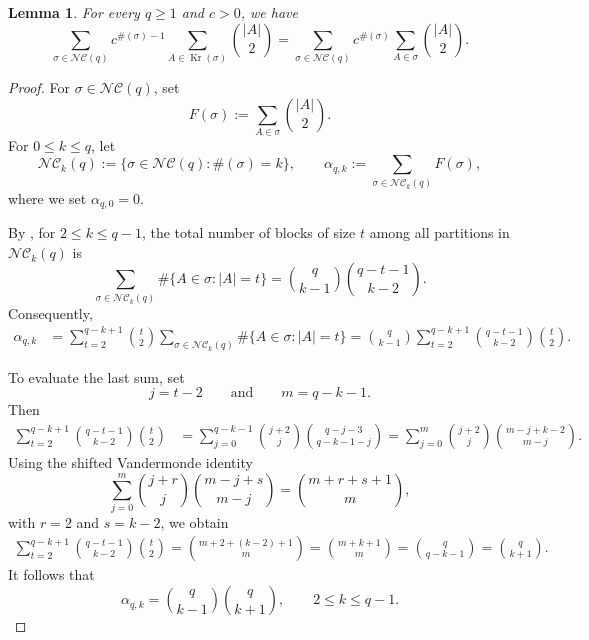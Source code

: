 \documentclass{article}
\newtheorem{lemma}      [theorem]{Lemma}
\theoremstyle{definition}
\newcommand{\NC}{\mathcal{NC}}
\begin{document}
{%

\begin{lemma}\label{lem:weighted-Kreweras-identity}
For every \(q\geq 1\) and \(c>0\), we have
\[
\sum_{\sigma\in\NC(q)}
c^{\#(\sigma)-1}
\sum_{A\in\operatorname{Kr}(\sigma)}
\binom{|A|}{2}
=
\sum_{\sigma\in\NC(q)}
c^{\#(\sigma)}
\sum_{A\in\sigma}
\binom{|A|}{2}.
\]
\end{lemma}

\begin{proof}
For \(\sigma\in\NC(q)\), set
\[
F(\sigma)
:=
\sum_{A\in\sigma}\binom{|A|}{2}.
\]
For \(0\leq k\leq q\), let
\[
\NC_k(q)
:=
\bigl\{
\sigma\in\NC(q):\#(\sigma)=k
\bigr\},
\qquad
\alpha_{q,k}
:=
\sum_{\sigma\in\NC_k(q)}F(\sigma),
\]
where we set \(\alpha_{q,0}=0\).

By \cite[Proposition~2.1]{Arizmendi12}, for
\(2\leq k\leq q-1\), the total number of blocks of size \(t\)
among all partitions in \(\NC_k(q)\) is
\[
\sum_{\sigma\in\NC_k(q)}
\#\bigl\{
A\in\sigma:|A|=t
\bigr\}
=
\binom{q}{k-1}
\binom{q-t-1}{k-2}.
\]
Consequently,
\begin{align*}
\alpha_{q,k}
&=
\sum_{t=2}^{q-k+1}
\binom{t}{2}
\sum_{\sigma\in\NC_k(q)}
\#\bigl\{
A\in\sigma:|A|=t
\bigr\} 
=
\binom{q}{k-1}
\sum_{t=2}^{q-k+1}
\binom{q-t-1}{k-2}
\binom{t}{2}.
\end{align*}

To evaluate the last sum, set
\[
j=t-2
\qquad\text{and}\qquad
m=q-k-1.
\]
Then
\begin{align*}
\sum_{t=2}^{q-k+1}
\binom{q-t-1}{k-2}
\binom{t}{2}
&=
\sum_{j=0}^{q-k-1}
\binom{j+2}{j}
\binom{q-j-3}{q-k-1-j} 
=
\sum_{j=0}^{m}
\binom{j+2}{j}
\binom{m-j+k-2}{m-j}.
\end{align*}
Using the shifted Vandermonde identity
\[
\sum_{j=0}^{m}
\binom{j+r}{j}
\binom{m-j+s}{m-j}
=
\binom{m+r+s+1}{m},
\]
with \(r=2\) and \(s=k-2\), we obtain
\begin{align*}
\sum_{t=2}^{q-k+1}
\binom{q-t-1}{k-2}
\binom{t}{2}
=
\binom{m+2+(k-2)+1}{m} 
=
\binom{m+k+1}{m} 
=
\binom{q}{q-k-1}
=
\binom{q}{k+1}.
\end{align*}
It follows that
\[
\alpha_{q,k}
=
\binom{q}{k-1}
\binom{q}{k+1},
\qquad
2\leq k\leq q-1.
\]


\end{proof}}
\end{document}
